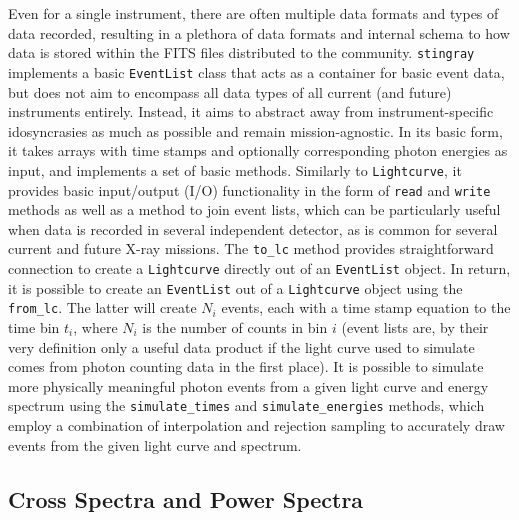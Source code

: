 \documentclass[twocolumn]{aastex62}
\newcommand{\stingray}{\texttt{stingray}\xspace}
\newcommand{\lightcurve}{\texttt{Lightcurve}\xspace}
\newcommand{\eventlist}{\texttt{EventList}\xspace}
\begin{document}
Even for a single instrument, there are often multiple data formats and types of data recorded, resulting in a plethora of data formats and internal schema to how data is stored within the FITS files distributed to the community. \stingray implements a basic \eventlist class that acts as a container for basic event data, but does not aim to encompass all data types of all current (and future) instruments entirely. Instead, it aims to abstract away from instrument-specific idosyncrasies as much as possible and remain mission-agnostic. In its basic form, it takes arrays with time stamps and optionally corresponding photon energies as input, and implements a set of basic methods. Similarly to \lightcurve, it provides basic input/output (I/O) functionality in the form of \texttt{read} and \texttt{write} methods as well as a method to join event lists, which can be particularly useful when data is recorded in several independent detector, as is common for several current and future X-ray missions. The \verb|to_lc| method provides straightforward connection to create a \lightcurve directly out of an \eventlist object. In return, it is possible to create an \eventlist out of a \lightcurve object using the \verb|from_lc|. The latter will create $N_i$ events, each with a time stamp equation to the time bin $t_i$, where $N_i$ is the number of counts in bin $i$ (event lists are, by their very definition only a useful data product if the light curve used to simulate comes from photon counting data in the first place). 
It is possible to simulate more physically meaningful photon events from a given light curve and energy spectrum using the \verb|simulate_times| and \verb|simulate_energies| methods, which employ a combination of interpolation and rejection sampling to accurately draw events from the given light curve and spectrum.


\subsection{Cross Spectra and Power Spectra}
\label{sec:csps}
\end{document}
